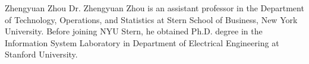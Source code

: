 \documentclass[journal]{IEEEtran}
\begin{document}
\begin{IEEEbiography}{Zhengyuan Zhou}
Dr. Zhengyuan Zhou is an assistant professor in the Department of Technology, Operations, and Statistics at Stern School of Business, New York University. Before joining NYU Stern, he obtained Ph.D. degree in the Information System Laboratory in Department of Electrical Engineering at Stanford University. 
\end{IEEEbiography}






\appendices







\ifCLASSOPTIONcaptionsoff
  \newpage
\fi




% 







\end{document}
